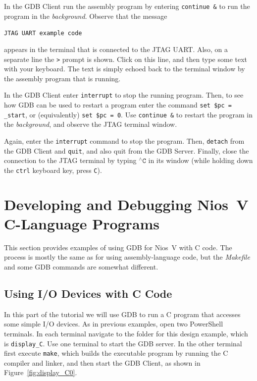 \documentclass[11pt, twoside, pdftex]{article}
\begin{document}
In the GDB Client run the assembly program by entering \texttt{continue \&} to run the
program in the {\it background}. Observe that the message 

\texttt{JTAG UART example code}

appears in the terminal that is connected to the
JTAG UART. Also, on a separate line the \texttt{>} prompt is shown. Click on this line,
and then type some text with your keyboard. The text is simply echoed back to the terminal
window by the assembly program that is running. 

In the GDB Client enter \texttt{interrupt} to stop the running program. Then, to see how GDB can
be used to restart a program enter the command \texttt{set \$pc = \_start}, or
(equivalently) \texttt{set \$pc = 0}. Use \texttt{continue \&} to restart the program in 
the {\it background}, and observe the JTAG terminal window. 

Again, enter the \texttt{interrupt} command to stop the program. Then, \texttt{detach} 
from the GDB Client and \texttt{quit}, and also quit from the GDB Server. Finally, close 
the connection to the JTAG terminal by typing $^{\wedge}\texttt{C}$ in its window
(while holding down the \texttt{ctrl} keyboard key, press \texttt{C}).

\section{Developing and Debugging Nios~V C-Language Programs}
\label{sec:c-code}

This section provides examples of using GDB for Nios~V with C code. The process is mostly
the same as for using assembly-language code, but the {\it Makefile} and some GDB commands are
somewhat different. 

\subsection{Using I/O Devices with C Code}

In this part of the tutorial we will use GDB to run a C program that accesses some simple 
I/O devices. As in previous examples, open two PowerShell terminals. In each terminal 
navigate to the folder for this design example, which is \texttt{display\_C}. Use one 
terminal to start the GDB server. In the other terminal first execute \texttt{make}, which 
builds the executable program by running the C compiler and linker, and then start the GDB 
Client, as shown in Figure~\ref{fig:display_C0}.
\end{document}
